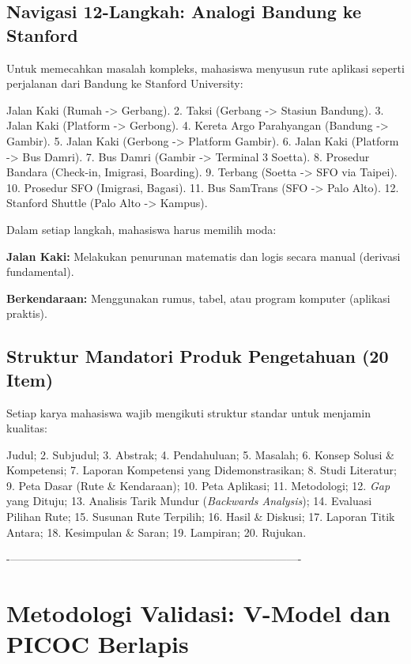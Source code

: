 \documentclass[
  letterpaper,
  DIV=11,
  numbers=noendperiod]{scrreprt}
\begin{document}
\subsection{Navigasi 12-Langkah: Analogi Bandung ke
Stanford}\label{navigasi-12-langkah-analogi-bandung-ke-stanford}

Untuk memecahkan masalah kompleks, mahasiswa menyusun rute aplikasi
seperti perjalanan dari Bandung ke Stanford University:

Jalan Kaki (Rumah -\textgreater{} Gerbang). 2. Taksi (Gerbang
-\textgreater{} Stasiun Bandung). 3. Jalan Kaki (Platform
-\textgreater{} Gerbong). 4. Kereta Argo Parahyangan (Bandung
-\textgreater{} Gambir). 5. Jalan Kaki (Gerbong -\textgreater{} Platform
Gambir). 6. Jalan Kaki (Platform -\textgreater{} Bus Damri). 7. Bus
Damri (Gambir -\textgreater{} Terminal 3 Soetta). 8. Prosedur Bandara
(Check-in, Imigrasi, Boarding). 9. Terbang (Soetta -\textgreater{} SFO
via Taipei). 10. Prosedur SFO (Imigrasi, Bagasi). 11. Bus SamTrans (SFO
-\textgreater{} Palo Alto). 12. Stanford Shuttle (Palo Alto
-\textgreater{} Kampus).

Dalam setiap langkah, mahasiswa harus memilih moda:

\textbf{Jalan Kaki:} Melakukan penurunan matematis dan logis secara
manual (derivasi fundamental).

\textbf{Berkendaraan:} Menggunakan rumus, tabel, atau program komputer
(aplikasi praktis).

\subsection{Struktur Mandatori Produk Pengetahuan (20
Item)}\label{struktur-mandatori-produk-pengetahuan-20-item}

Setiap karya mahasiswa wajib mengikuti struktur standar untuk menjamin
kualitas:

Judul; 2. Subjudul; 3. Abstrak; 4. Pendahuluan; 5. Masalah; 6. Konsep
Solusi \& Kompetensi; 7. Laporan Kompetensi yang Didemonstrasikan; 8.
Studi Literatur; 9. Peta Dasar (Rute \& Kendaraan); 10. Peta Aplikasi;
11. Metodologi; 12. \emph{Gap} yang Dituju; 13. Analisis Tarik Mundur
(\emph{Backwards Analysis}); 14. Evaluasi Pilihan Rute; 15. Susunan Rute
Terpilih; 16. Hasil \& Diskusi; 17. Laporan Titik Antara; 18. Kesimpulan
\& Saran; 19. Lampiran; 20. Rujukan.

-\/-------------------------------------------------------------------------------

\section{Metodologi Validasi: V-Model dan PICOC
Berlapis}\label{metodologi-validasi-v-model-dan-picoc-berlapis}
\end{document}
